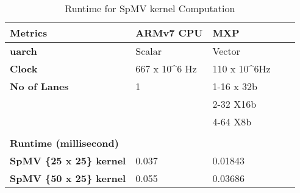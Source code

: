 \begin{table}[htbp]
	\centering
	
	\begin{adjustbox}{width=.7\textwidth}
		\small
		
	\begin{tabular}{lllll}
		\toprule
		\textbf{Metrics} & \textbf{ARMv7 CPU} & \textbf{MXP}  \\
		\midrule
		\textbf{uarch} & Scalar & Vector \\
		\textbf{Clock} & 667 x 10^{6} Hz & 110 x 10^{6}Hz  \\
		\textbf{No of Lanes} & 1 & 1-16 x 32b  \\
		&   & 2-32 X16b  \\
		&   & 4-64 X8b \\
		&   &   \\
		\midrule
		\textbf{Runtime (millisecond)  } &   &   &   &  \\
		\midrule
		\textbf{SpMV \{25 x 25\} kernel} & 0.037 & 0.01843  \\
		\textbf{SpMV \{50 x 25\} kernel} & 0.055 & 0.03686  \\
		\bottomrule
	\end{tabular}%
    \end{adjustbox}%
      \caption{Runtime for SpMV kernel Computation}
	\label{www:1010}%
\end{table}%
    	 